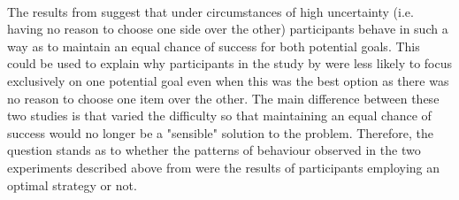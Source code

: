 \documentclass[12pt]{article}
\begin{document}

\paragraph{} The results from \cite{CHAPMAN2010168} suggest that under circumstances of high uncertainty (i.e. having no reason to choose one side over the other) participants behave in such a way as to maintain an equal chance of success for both potential goals. This could be used to explain why participants in the study by \cite{clarke2015failure} were less likely to focus exclusively on one potential goal even when this was the best option as there was no reason to choose one item over the other. The main difference between these two studies is that \cite{clarke2015failure} varied the difficulty so that maintaining an equal chance of success would no longer be a "sensible" solution to the problem. Therefore, the question stands as to whether the patterns of behaviour observed in the two experiments described above from \cite{CHAPMAN2010168} were the results of participants employing an optimal strategy or not.%
\end{document}

